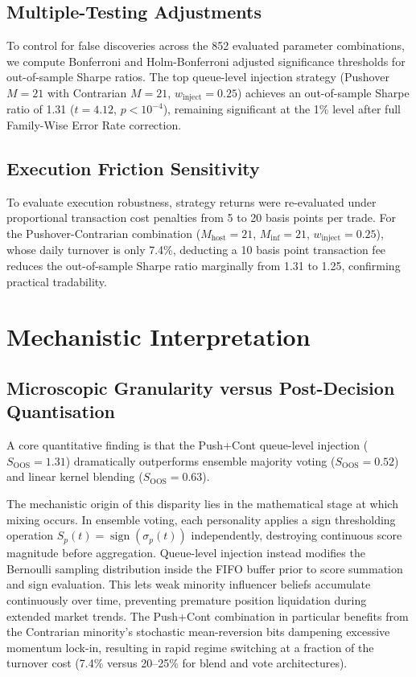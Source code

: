 \documentclass[10pt,twocolumn,twoside,a4paper]{article}
\DeclareMathOperator{\sign}{sign}
\begin{document}
\subsection{Multiple-Testing Adjustments}
To control for false discoveries across the 852 evaluated parameter combinations, we compute
Bonferroni and Holm-Bonferroni adjusted significance thresholds for out-of-sample Sharpe ratios.
The top queue-level injection strategy (Pushover $M=21$ with Contrarian $M=21$,
$w_{\text{inject}}=0.25$) achieves an out-of-sample Sharpe ratio of 1.31 ($t=4.12$,
$p<10^{-4}$), remaining significant at the 1\% level after full Family-Wise Error Rate correction.

\subsection{Execution Friction Sensitivity}
To evaluate execution robustness, strategy returns were re-evaluated under proportional transaction
cost penalties from 5 to 20 basis points per trade. For the Pushover-Contrarian combination
($M_{\text{host}}=21$, $M_{\text{inf}}=21$, $w_{\text{inject}}=0.25$), whose daily turnover is
only 7.4\%, deducting a 10 basis point transaction fee reduces the out-of-sample Sharpe ratio
marginally from 1.31 to 1.25, confirming practical tradability.

\section{Mechanistic Interpretation}

\subsection{Microscopic Granularity versus Post-Decision Quantisation}
A core quantitative finding is that the Push+Cont queue-level injection ($S_{\text{OOS}}=1.31$)
dramatically outperforms ensemble majority voting ($S_{\text{OOS}}=0.52$) and linear kernel
blending ($S_{\text{OOS}}=0.63$).

The mechanistic origin of this disparity lies in the mathematical stage at which mixing occurs. In
ensemble voting, each personality applies a sign thresholding operation $S_p(t)=\sign(\sigma_p(t))$
independently, destroying continuous score magnitude before aggregation. Queue-level injection
instead modifies the Bernoulli sampling distribution inside the FIFO buffer prior to score summation
and sign evaluation. This lets weak minority influencer beliefs accumulate continuously over time,
preventing premature position liquidation during extended market trends. The Push+Cont combination
in particular benefits from the Contrarian minority's stochastic mean-reversion bits dampening
excessive momentum lock-in, resulting in rapid regime switching at a fraction of the turnover
cost (7.4\% versus 20--25\% for blend and vote architectures).
\end{document}
